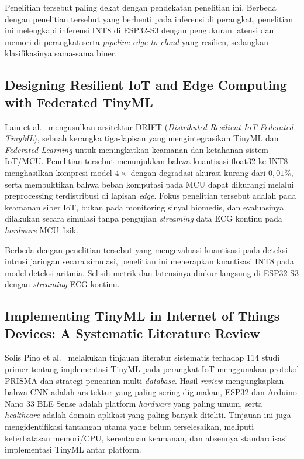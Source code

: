 Penelitian tersebut paling dekat dengan pendekatan penelitian ini. Berbeda dengan penelitian tersebut yang berhenti pada inferensi di perangkat, penelitian ini melengkapi inferensi INT8 di ESP32-S3 dengan pengukuran latensi dan memori di perangkat serta \textit{pipeline} \textit{edge-to-cloud} yang resilien, sedangkan klasifikasinya sama-sama biner.

\subsection{Designing Resilient IoT and Edge Computing with Federated TinyML}

Laiu et al.~\cite{laiu_2026} mengusulkan arsitektur DRIFT (\textit{Distributed Resilient IoT Federated TinyML}), sebuah kerangka tiga-lapisan yang mengintegrasikan TinyML dan \textit{Federated Learning} untuk meningkatkan keamanan dan ketahanan sistem IoT/MCU. Penelitian tersebut menunjukkan bahwa kuantisasi float32 ke INT8 menghasilkan kompresi model $4\times$ dengan degradasi akurasi kurang dari $0{,}01\%$, serta membuktikan bahwa beban komputasi pada MCU dapat dikurangi melalui preprocessing terdistribusi di lapisan \textit{edge}. Fokus penelitian tersebut adalah pada keamanan siber IoT, bukan pada monitoring sinyal biomedis, dan evaluasinya dilakukan secara simulasi tanpa pengujian \textit{streaming} data ECG kontinu pada \textit{hardware} MCU fisik.

Berbeda dengan penelitian tersebut yang mengevaluasi kuantisasi pada deteksi intrusi jaringan secara simulasi, penelitian ini menerapkan kuantisasi INT8 pada model deteksi aritmia. Selisih metrik dan latensinya diukur langsung di ESP32-S3 dengan \textit{streaming} ECG kontinu.

\subsection{Implementing TinyML in Internet of Things Devices: A Systematic Literature Review}

Solis Pino et al.~\cite{tinyml_iot_review} melakukan tinjauan literatur sistematis terhadap 114 studi primer tentang implementasi TinyML pada perangkat IoT menggunakan protokol PRISMA dan strategi pencarian multi-\textit{database}. Hasil \textit{review} mengungkapkan bahwa CNN adalah arsitektur yang paling sering digunakan, ESP32 dan Arduino Nano 33 BLE Sense adalah platform \textit{hardware} yang paling umum, serta \textit{healthcare} adalah domain aplikasi yang paling banyak diteliti. Tinjauan ini juga mengidentifikasi tantangan utama yang belum terselesaikan, meliputi keterbatasan memori/CPU, kerentanan keamanan, dan absennya standardisasi implementasi TinyML antar platform.

